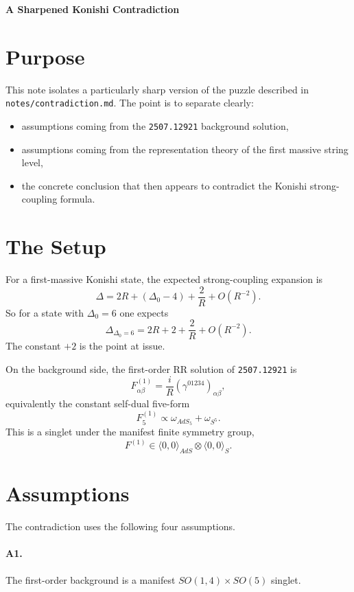 \documentclass[12pt]{article}
\def\be{\begin{equation}}
\def\ee{\end{equation}}
\newcommand{\D}{\Delta}
\newcommand{\la}{\langle}
\newcommand{\ra}{\rangle}
\begin{document}
\begin{center}
{\Large\bf A Sharpened Konishi Contradiction}
\end{center}

\section{Purpose}

This note isolates a particularly sharp version of the puzzle described in
\texttt{notes/contradiction.md}.  The point is to separate clearly:
\begin{itemize}
\item assumptions coming from the \texttt{2507.12921} background solution,
\item assumptions coming from the representation theory of the first massive string level,
\item the concrete conclusion that then appears to contradict the Konishi strong-coupling formula.
\end{itemize}

\section{The Setup}

For a first-massive Konishi state, the expected strong-coupling expansion is
\be
\D = 2R + (\D_0-4) + \frac{2}{R} + O(R^{-2}).
\ee
So for a state with $\D_0=6$ one expects
\be
\D_{\D_0=6}=2R+2+\frac{2}{R}+O(R^{-2}).
\ee
The constant $+2$ is the point at issue.

On the background side, the first-order RR solution of \texttt{2507.12921} is
\be
F^{(1)}_{\alpha\beta}=\frac{i}{R}(\gamma^{01234})_{\alpha\beta},
\ee
equivalently the constant self-dual five-form
\be
F^{(1)}_5\propto \omega_{AdS_5}+\omega_{S^5}.
\ee
This is a singlet under the manifest finite symmetry group,
\be
F^{(1)}\in \la 0,0\ra_{AdS}\otimes \la 0,0\ra_{S}.
\ee

\section{Assumptions}

The contradiction uses the following four assumptions.

\paragraph{A1.} The first-order background is a manifest
$SO(1,4)\times SO(5)$ singlet.
\end{document}
